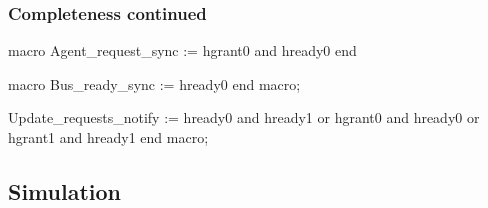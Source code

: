 \documentclass[]{beamer}
\begin{document}
       \begin{frame}[fragile]
         \frametitle{Completeness continued}
       \begin{VHI}
macro Agent_request_sync := hgrant0 and hready0 end

macro Bus_ready_sync := hready0 end macro;



Update_requests_notify :=
hready0 and hready1 or
hgrant0 and hready0 or
hgrant1 and hready1
end macro;

       \end{VHI}
       \end{frame}
  

       \subsection{Simulation}
\end{document}
